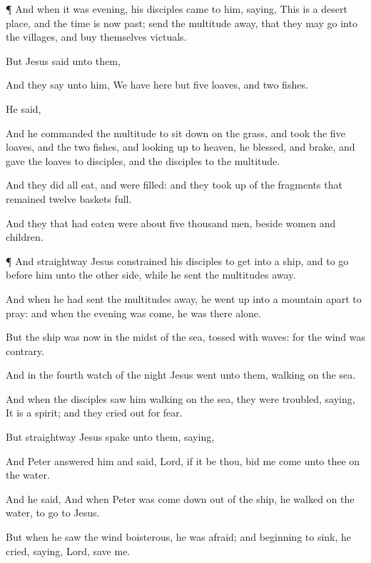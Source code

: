 {\par }{\PP {}¶
And when it
was
evening,
his
disciples
came to
him,
saying, This
is a
desert
place,
and the
time
is
now
past;
send the
multitude
away,
that they
may
go
into the
villages, and
buy
themselves
victuals.

But
Jesus
said unto
them,
{}

And they
say unto
him, We
have
here
but
five
loaves,
and
two
fishes.

He
said,
{}

And he
commanded the
multitude to sit
down
on the
grass,
and
took
the
five
loaves,
and
the
two
fishes, and looking
up
to
heaven, he
blessed,
and
brake, and
gave the
loaves
to
{}
disciples,
and the
disciples to the
multitude.

And they
did
all
eat,
and were
filled:
and they took
up of the
fragments that
remained
twelve
baskets
full.

And they that had
eaten
were
about five
thousand
men,
beside
women
and
children.


\par }{\PP {}¶
And
straightway
Jesus
constrained
his
disciples to
get
into a
ship,
and to go
before
him
unto the other
side,
while he
sent the
multitudes
away.

And when he had
sent the
multitudes
away, he went
up
into a
mountain
apart to
pray: and
when the
evening was
come, he
was
there
alone.

But the
ship
was
now in the
midst of the
sea,
tossed
with
waves:
for the
wind
was
contrary.

And in the
fourth
watch of the
night
Jesus
went
unto
them,
walking
on the
sea.

And
when the
disciples
saw
him
walking
on the
sea, they were
troubled,
saying, It
is a
spirit;
and they cried
out
for
fear.

But
straightway
Jesus
spake unto
them,
saying,
{}

And
Peter
answered
him and
said,
Lord,
if it
be
thou,
bid
me
come
unto
thee
on the
water.

And he
said,
{} And
when
Peter was come
down
out of the
ship, he
walked
on the
water, to
go
to
Jesus.

But when he
saw the
wind
boisterous, he was
afraid;
and
beginning to
sink, he
cried,
saying,
Lord,
save
me.

}

